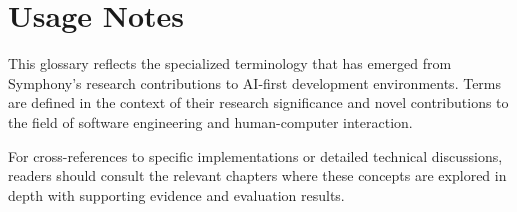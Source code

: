 \section*{Usage Notes}

This glossary reflects the specialized terminology that has emerged from Symphony's research contributions to AI-first development environments. Terms are defined in the context of their research significance and novel contributions to the field of software engineering and human-computer interaction.

For cross-references to specific implementations or detailed technical discussions, readers should consult the relevant chapters where these concepts are explored in depth with supporting evidence and evaluation results.
